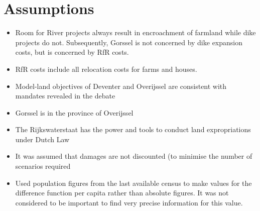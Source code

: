 
\section{Assumptions}
\begin{itemize}
    \item Room for River projects always result in encroachment of farmland while dike projects do not. Subsequently, Gorssel is not concerned by dike expansion costs, but is concerned by RfR costs.
    \item RfR costs include all relocation costs for farms and houses.
    \item Model-land objectives of Deventer and Overijssel are consistent with mandates revealed in the debate
    \item Gorssel is in the province of Overijssel
    \item The Rijkswaterstaat has the power and tools to conduct land expropriations under Dutch Law
    \item It was assumed that damages are not discounted (to minimise the number of scenarios required
    \item Used population figures from the last available census to make values for the difference function per capita rather than absolute figures. It was not considered to be important to find very precise information for this value.
\end{itemize}





    
